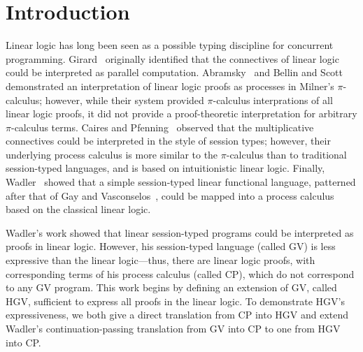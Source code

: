 \documentclass{easychair}
\newcommand{\hgv}{HGV\xspace}
\begin{document}
%
%



\section{Introduction}

Linear logic has long been seen as a possible typing discipline for concurrent programming.
Girard~\cite{Girard87} originally identified that the connectives of linear logic could be
interpreted as parallel computation.  Abramsky~\cite{Abramsky92} and Bellin and
Scott~\cite{BellinScott94} demonstrated an interpretation of linear logic proofs as processes in
Milner's $\pi$-calculus; however, while their system provided $\pi$-calculus interprations of all
linear logic proofs, it did not provide a proof-theoretic interpretation for arbitrary
$\pi$-calculus terms.  Caires and Pfenning~\cite{CairesPfenning10} observed that the multiplicative
connectives could be interpreted in the style of session types; however, their underlying process
calculus is more similar to the $\pi$-calculus than to traditional session-typed languages, and is
based on intuitionistic linear logic.  Finally, Wadler~\cite{Wadler12} showed that a simple
session-typed linear functional language, patterned after that of Gay and
Vasconselos~\cite{GayVasconcelos10}, could be mapped into a process calculus based on the classical
linear logic.

Wadler's work showed that linear session-typed programs could be interpreted as proofs in linear
logic.  However, his session-typed language (called GV) is less expressive than the linear
logic---thus, there are linear logic proofs, with corresponding terms of his process calculus
(called CP), which do not correspond to any GV program.  This work begins by defining an extension
of GV, called \hgv, sufficient to express all proofs in the linear logic. To demonstrate \hgv's
expressiveness, we both give a direct translation from CP into \hgv and extend Wadler's
continuation-passing translation from GV into CP to one from \hgv into CP.
\end{document}
